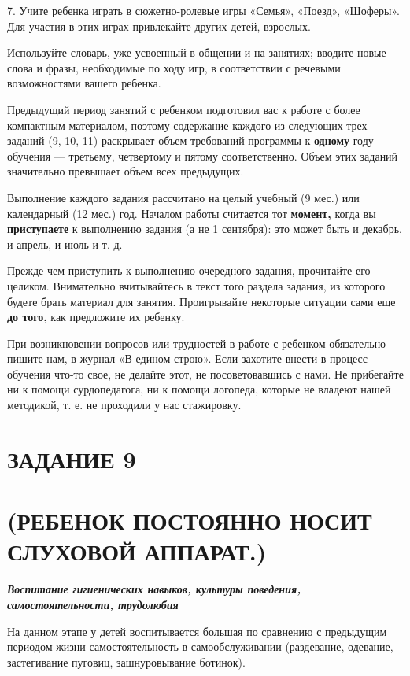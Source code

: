 \documentclass{book}
\newcounter{structure}
\renewcommand{\emph}[1]{\textit{#1}}
\begin{document}
7. Учите ребенка играть в сюжетно-ролевые игры «Семья», «Поезд»,
«Шоферы». Для участия в этих играх привлекайте других детей, взрослых.

Используйте словарь, уже усвоенный в общении и на занятиях; вводите
новые слова и фразы, необходимые по ходу игр, в соответствии с речевыми
возможностями вашего ребенка.


Предыдущий период занятий с ребенком подготовил вас к работе с более
компактным материалом, поэтому содержание каждого из следующих трех
заданий (9, 10, 11) раскрывает объем требований программы к
\textbf{одному} году обучения --- третьему, четвертому и пятому
соответственно. Объем этих заданий значительно превышает объем всех
предыдущих.

Выполнение каждого задания рассчитано на целый учебный (9 мес.) или
календарный (12 мес.) год. Началом работы считается тот \textbf{момент,}
когда вы \textbf{приступаете} к выполнению задания (а не 1 сентября):
это может быть и декабрь, и апрель, и июль и т. д.

Прежде чем приступить к выполнению очередного задания, прочитайте его
целиком. Внимательно вчитывайтесь в текст того раздела задания, из
которого будете брать материал для занятия. Проигрывайте некоторые
ситуации сами еще \textbf{до того,} как предложите их ребенку.

При возникновении вопросов или трудностей в работе с ребенком
обязательно пишите нам, в журнал «В едином строю». Если захотите внести
в процесс обучения что-то свое, не делайте этот, не посоветовавшись с
нами. Не прибегайте ни к помощи сурдопедагога, ни к помощи логопеда,
которые не владеют нашей методикой, т. е. не проходили у нас стажировку.

\section{ЗАДАНИЕ 9}\section*{(РЕБЕНОК ПОСТОЯННО НОСИТ СЛУХОВОЙ АППАРАТ.)}

\emph{\textbf{Воспитание гигиенических навыков, культуры поведения,
самостоятельности, трудолюбия}}

На данном этапе у детей воспитывается большая по сравнению с предыдущим
периодом жизни самостоятельность в самообслуживании (раздевание,
одевание, застегивание пуговиц, зашнуровывание ботинок).
\end{document}

